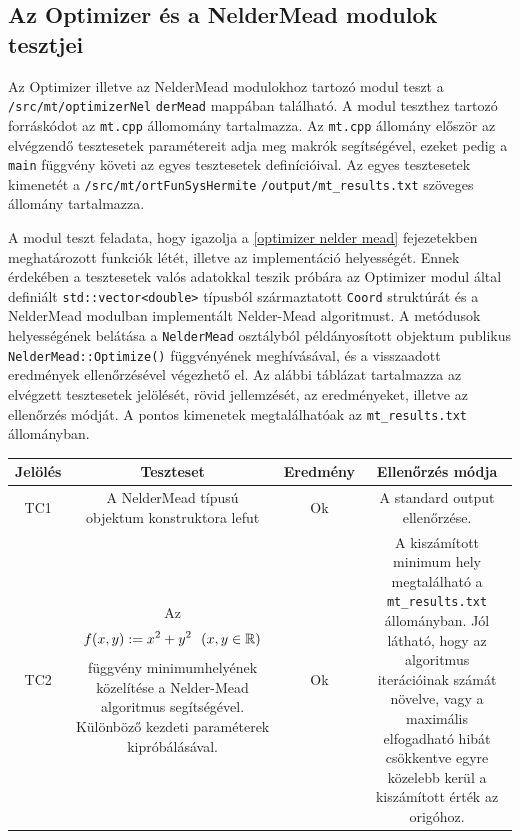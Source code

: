 \documentclass[oneside,titlepage,12pt,a4paper]{report}
\begin{document}
\subsection{Az Optimizer és a NelderMead modulok tesztjei}

Az Optimizer illetve az NelderMead modulokhoz tartozó modul teszt a \texttt{/src/mt/optimizerNel} \linebreak \texttt{derMead} mappában található. A modul teszthez tartozó forráskódot az \texttt{mt.cpp} állomomány tartalmazza. Az \texttt{mt.cpp} állomány először az elvégzendő tesztesetek paramétereit adja meg makrók segítségével, ezeket pedig a \texttt{main} függvény követi az egyes \linebreak  tesztesetek definícióival. Az egyes tesztesetek kimenetét a \texttt{/src/mt/ortFunSysHermite} \linebreak  \texttt{/output/mt\_results.txt} szöveges állomány tartalmazza. 
\par A modul teszt feladata, hogy igazolja a \ref{optimizer nelder mead} fejezetekben meghatározott funkciók létét, illetve az implementáció helyességét. Ennek érdekében a tesztesetek valós adatokkal teszik próbára az Optimizer modul által definiált \texttt{std::vector<double>} típusból származtatott \texttt{Coord} struktúrát és a NelderMead modulban implementált Nelder-Mead algoritmust. A metódusok helyességének belátása a \texttt{NelderMead} osztályból példányosított objektum publikus \texttt{NelderMead::Optimize()} függvényének meghívásával, és a visszaadott eredmények ellenőrzésével végezhető el. Az alábbi táblázat tartalmazza az elvégzett tesztesetek jelölését, rövid jellemzését, az eredményeket, illetve az ellenőrzés módját. A pontos kimenetek megtalálhatóak az \texttt{mt\_results.txt} állományban. 

\begin{center}
\begin{adjustbox}{width=1\textwidth}
 \begin{tabular}{||c c c c||} 
 \hline
 Jelölés & Teszteset & Eredmény &  Ellenőrzés módja \\ [0.5ex] 
 \hline\hline
 TC1 & A NelderMead típusú objektum konstruktora lefut &  Ok & A standard output ellenőrzése. \\ 
 \hline
 TC2 &
 Az
\vbox{
\begin{equation}
 f(x, y):=x^{2}+y^{2}\ \  (x,y\in\Bbb R)
\end{equation}
} 
 függvény minimumhelyének közelítése a Nelder-Mead algoritmus segítségével. Különböző kezdeti paraméterek kipróbálásával.
 &  Ok & A kiszámított minimum hely megtalálható a \texttt{mt\_results.txt} állományban. Jól látható, hogy az algoritmus iterációinak számát növelve, vagy a maximális elfogadható hibát csökkentve egyre közelebb kerül a kiszámított érték az origóhoz. \\
 \hline
\end{tabular}
\end{adjustbox}
\end{center}
\end{document}

